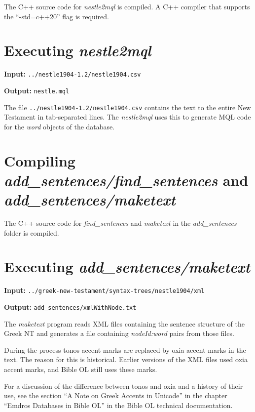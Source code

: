 \documentclass[11pt,oneside,a4paper,article]{memoir}
\begin{document}
The C++ source code for \emph{nestle2mql} is compiled. A C++ compiler that supports the
``-std=c++20'' flag is required.


\section{Executing \emph{nestle2mql}}

\noindent \textbf{Input:} \texttt{../nestle1904-1.2/nestle1904.csv}

\noindent \textbf{Output:} \texttt{nestle.mql}

\vspace{1ex}

\noindent
The file \texttt{../nestle1904-1.2/nestle1904.csv} contains the text to the entire New Testament in
tab-separated lines. The \emph{nestle2mql} uses this to generate MQL code for the \emph{word}
objects of the database.


\section{Compiling \emph{add\_sentences/find\_sentences} and \emph{add\_sentences/maketext}}

The C++ source code for \emph{find\_sentences} and \emph{maketext} in the \emph{add\_sentences}
folder is compiled.


\section{Executing \emph{add\_sentences/maketext}}\label{sec:maketext}

\noindent \textbf{Input:} \texttt{../greek-new-testament/syntax-trees/nestle1904/xml}

\noindent \textbf{Output:} \texttt{add\_sentences/xmlWithNode.txt}

\vspace{1ex}

\noindent
The \emph{maketext} program reads XML files containing the sentence structure of the Greek NT and
generates a file containing \emph{nodeId:word} pairs from those files.

During the process tonos accent marks are replaced by oxia accent marks in the text. The reason for
this is historical. Earlier versions of the XML files used oxia accent marks, and Bible OL still
uses these marks.

For a discussion of the difference between tonos and oxia and a history of their use, see the
section ``A Note on Greek Accents in Unicode'' in the chapter ``Emdros Databases in Bible OL'' in
the Bible OL technical documentation.
\end{document}
